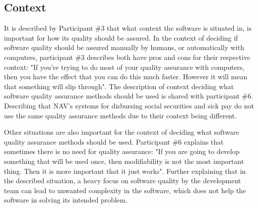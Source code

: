 \subsection{Context} \label{sec:context}
It is described by Participant \#3 that what context the software is situated in, is important for how its quality should be assured. In the context of deciding if software quality should be assured manually by humans, or automatically with computers, participant \#3 describes both have pros and cons for their respective context: "If you're trying to do most of your quality assurance with computers, then you have the effect that you can do this much faster. However it will mean that something will slip through". The description of context deciding what software quality assurance methods should be used is shared with participant \#6. Describing that NAV's systems for disbursing social securities and sick pay do not use the same quality assurance methods due to their context being different.




Other situations are also important for the context of deciding what software quality assurance methods should be used. Participant \#6 explains that sometimes there is no need for quality assurance: "If you are going to develop something that will be used once, then modifiability is not the most important thing. Then it is more important that it just works". Further explaining that in the described situation, a heavy focus on software quality by the development team can lead to unwanted complexity in the software, which does not help the software in solving its intended problem.

